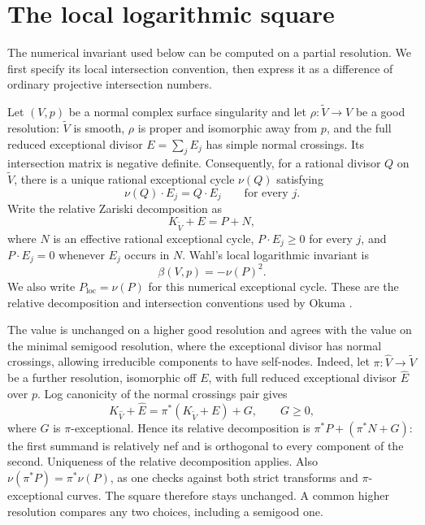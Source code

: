 \section{The local logarithmic square}
\label{sec:local-square}

The numerical invariant used below can be computed on a partial resolution.
We first specify its local intersection convention, then express it as a
difference of ordinary projective intersection numbers.

Let $(V,p)$ be a normal complex surface singularity and let
$\rho:\widetilde V\to V$ be a good resolution: $\widetilde V$ is smooth,
$\rho$ is proper and isomorphic away from $p$, and the full reduced
exceptional divisor $E=\sum_jE_j$ has simple normal crossings.
Its intersection matrix is negative definite.  Consequently, for a rational
divisor $Q$ on $\widetilde V$, there is a unique rational exceptional cycle
$\nu(Q)$ satisfying
\[
  \nu(Q)\cdot E_j=Q\cdot E_j\qquad\text{for every }j.
\]
Write the relative Zariski decomposition as
\[
 K_{\widetilde V}+E=P+N,
\]
where $N$ is an effective rational exceptional cycle, $P\cdot E_j\geq0$
for every $j$, and $P\cdot E_j=0$ whenever $E_j$ occurs in $N$.
Wahl's local logarithmic invariant \cite{Wahl1990} is
\begin{equation}\label{eq:beta-definition}
 \beta(V,p)=-\nu(P)^2.
\end{equation}
We also write $P_{\mathrm{loc}}=\nu(P)$ for this numerical exceptional cycle.
These are the relative decomposition and intersection conventions used by
Okuma \cite[Section~2, pp.~649--650]{Okuma2004}.

The value is unchanged on a higher good resolution and agrees with the
value on the minimal semigood resolution, where the exceptional divisor
has normal crossings, allowing irreducible components to have self-nodes.
Indeed, let $\pi:\widehat V\to\widetilde V$ be a further resolution,
isomorphic off $E$, with full reduced exceptional divisor $\widehat E$ over
$p$.  Log canonicity of the normal crossings pair gives
\[
 K_{\widehat V}+\widehat E
   =\pi^*(K_{\widetilde V}+E)+G,
 \qquad G\geq0,
\]
where $G$ is $\pi$-exceptional.  Hence its relative decomposition is
$\pi^*P+(\pi^*N+G)$: the first summand is relatively nef and is orthogonal
to every component of the second.  Uniqueness of the relative
decomposition applies.  Also $\nu(\pi^*P)=\pi^*\nu(P)$, as one checks
against both strict transforms and $\pi$-exceptional curves.  The square
therefore stays unchanged.  A common higher resolution compares any two
choices, including a semigood one.

